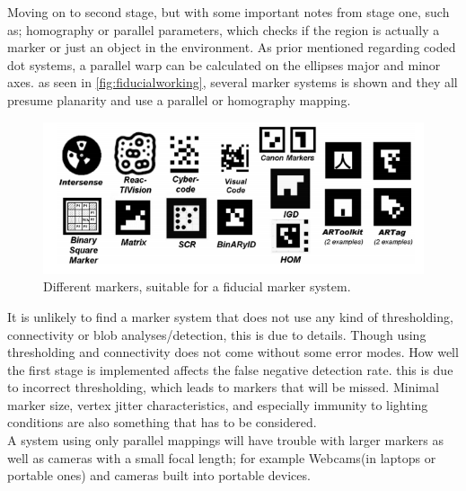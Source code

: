 			Moving on to second stage, but with some important notes from stage one, such as; homography or parallel parameters, which checks if the region is actually a marker or just an object in the environment. As prior mentioned regarding coded dot systems, a parallel warp can be calculated on the ellipses major and minor axes.
			as seen in \autoref{fig:fiducialworking}, several marker systems is shown and they all presume planarity and use a parallel or homography mapping.
			
			\begin{figure}[H]
				\centering
				\includegraphics[width=0.9\linewidth]{figure/Analysis/fiducialworking.png}
				\caption{Different markers, suitable for a fiducial marker system.}
				\label{fig:fiducialworking}
			\end{figure}
			
			It is unlikely to find a marker system that does not use any kind of thresholding, connectivity or blob analyses/detection, this is due to details. Though using thresholding and connectivity does not come without some error modes. How well the first stage is implemented affects the false negative detection rate. this is due to incorrect thresholding, which leads to markers that will be missed. Minimal marker size, vertex jitter characteristics, and especially immunity to
			lighting conditions\cite{fidOcclusion} are also something that has to be considered.\\
			
			A system using only parallel mappings will have trouble with larger markers as well as cameras with a small focal length; for example Webcams(in laptops or portable ones) and cameras built into portable devices.
			

